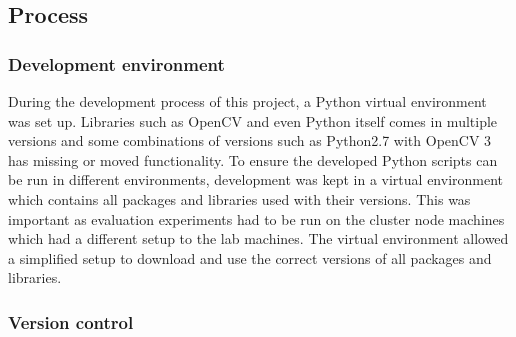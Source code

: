 \subsection{Process}

\subsubsection{Development environment}
During the development process of this project, a Python virtual environment was set up. Libraries such as OpenCV and even Python itself comes in multiple versions and some combinations of versions such as Python2.7 with OpenCV 3 has missing or moved functionality. To ensure the developed Python scripts can be run in different environments, development was kept in a virtual environment which contains all packages and libraries used with their versions. This was important as evaluation experiments had to be run on the cluster node machines which had a different setup to the lab machines. The virtual environment allowed a simplified setup to download and use the correct versions of all packages and libraries.

\subsubsection{Version control}


